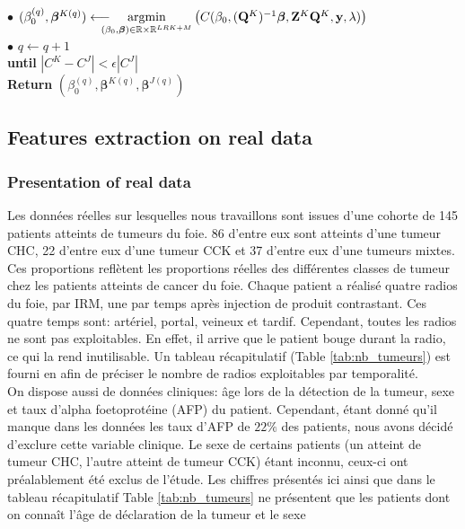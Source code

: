 \documentclass[10pt]{article}
\begin{document}
\begin{mdframed}[leftmargin=0cm, rightmargin=4cm]
    \phantom{a}\hspace{25 pt}  $\bullet$ $(\beta_0^{(q)}, \bm{\beta}^{K {(q)}}) \longleftarrow \hspace{-10 pt} \underset{(\beta_0, \bm{\beta}) \in \mathbb{R} \times \mathbb{R}^{LRK + M}}{\text{argmin}} \left( C(\beta_0, (\mathbf{Q}^K)^{-1}\bm{\beta},\mathbf{Z}^K \mathbf{Q}^K, \mathbf{y}, \lambda) \right)$\\[2 pt]
    \phantom{a}\hspace{25 pt}  $\bullet$ $q \leftarrow q + 1$\\[4 pt]
    \phantom{a}\hspace{8 pt}  \textbf{until} $|C^K - C^J| < \epsilon |C^J| $\\[4 pt]
    \textbf{Return} $(\beta_0^{(q)},\bm{\beta}^{K(q)}, \bm{\beta}^{J(q)})$
\end{mdframed}

\newpage

\subsection{Features extraction on real data}

\subsubsection{Presentation of real data}

Les données réelles sur lesquelles nous travaillons sont issues d'une cohorte de 145 patients atteints de tumeurs du foie. 86 d'entre eux sont atteints d'une tumeur CHC, 22 d'entre eux d'une tumeur CCK et 37 d'entre eux d'une tumeurs mixtes. Ces proportions reflètent les proportions réelles des différentes classes de tumeur chez les patients atteints de cancer du foie. Chaque patient a réalisé quatre radios du foie, par IRM, une par temps après injection de produit contrastant. Ces quatre temps sont: artériel, portal, veineux et tardif. Cependant, toutes les radios ne sont pas exploitables. En effet, il arrive que le patient bouge durant la radio, ce qui la rend inutilisable. Un tableau récapitulatif (Table \ref{tab:nb_tumeurs}) est fourni en afin de préciser le nombre de radios exploitables par temporalité.\\
\indent On dispose aussi de données cliniques: âge lors de la détection de la tumeur, sexe et taux d'alpha foetoprotéine (AFP) du patient. Cependant, étant donné qu'il manque dans les données les taux d'AFP de $22\%$ des patients, nous avons décidé d'exclure cette variable clinique. Le sexe de certains patients (un atteint de tumeur CHC, l'autre atteint de tumeur CCK) étant inconnu, ceux-ci ont préalablement été exclus de l'étude. Les chiffres présentés ici ainsi que dans le tableau récapitulatif Table \ref{tab:nb_tumeurs} ne présentent que les patients dont on connaît l'âge de déclaration de la tumeur et le sexe\\
\end{document}

